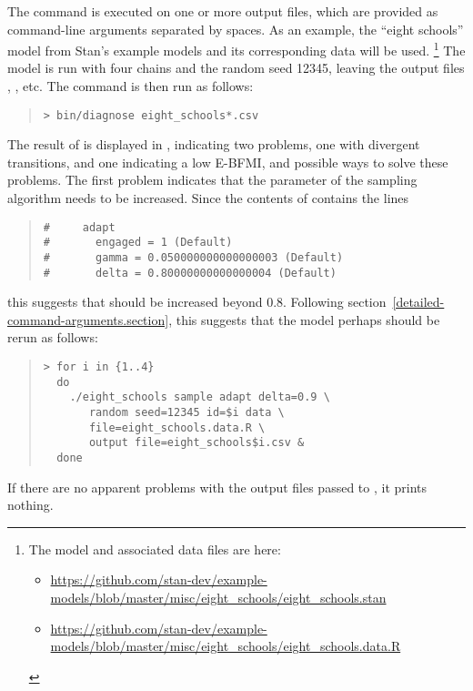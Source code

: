 The  command is executed on one or more output files,
which are provided as command-line arguments separated by spaces. As
an example, the ``eight schools'' model from Stan's example models and
its corresponding data will be used.%
%
\footnote{The model and associated data files are here:
  \begin{itemize}
  \item
    \url{https://github.com/stan-dev/example-models/blob/master/misc/eight_schools/eight_schools.stan}
  \item
    \url{https://github.com/stan-dev/example-models/blob/master/misc/eight_schools/eight_schools.data.R}
  \end{itemize}
}
The model is run with four chains and the random seed 12345, leaving
the output files , ,
etc. The  command is then run as follows:
\begin{quote}
\begin{Verbatim}[fontshape=sl]
> bin/diagnose eight_schools*.csv
\end{Verbatim}
\end{quote}
The result of  is displayed in
, indicating two problems, one with
divergent transitions, and one indicating a low E-BFMI, and possible
ways to solve these problems. The first problem indicates that the
parameter  of the sampling algorithm needs to be
increased. Since the contents of  contains
the lines
\begin{quote}
\begin{Verbatim}
#     adapt
#       engaged = 1 (Default)
#       gamma = 0.050000000000000003 (Default)
#       delta = 0.80000000000000004 (Default)
\end{Verbatim}
\end{quote}
this suggests that  should be increased beyond
0.8. Following section~\ref{detailed-command-arguments.section}, this
suggests that the model perhaps should be rerun as follows:
\begin{quote}
\begin{Verbatim}[fontshape=sl]
> for i in {1..4}
  do
    ./eight_schools sample adapt delta=0.9 \
       random seed=12345 id=$i data \
       file=eight_schools.data.R \
       output file=eight_schools$i.csv &
  done
\end{Verbatim}
\end{quote}

If there are no apparent problems with the output files passed to
, it prints nothing.

